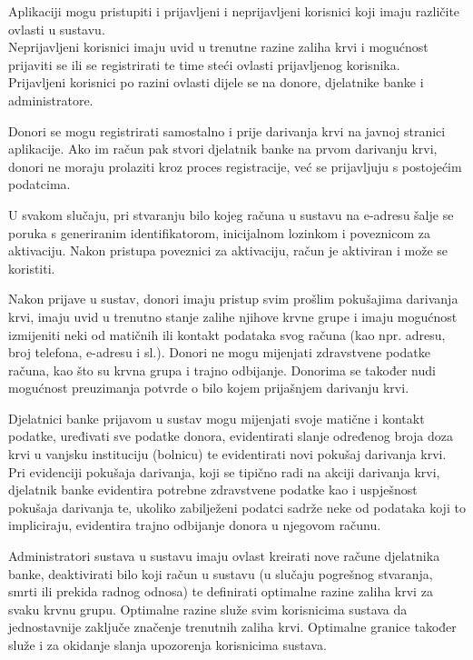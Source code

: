             \par{
            Aplikaciji mogu pristupiti i prijavljeni i neprijavljeni korisnici koji imaju različite ovlasti u sustavu.
            \\
            Neprijavljeni korisnici imaju uvid u trenutne razine zaliha krvi i mogućnost prijaviti se ili se registrirati te time steći ovlasti prijavljenog korisnika.
            \\
            Prijavljeni korisnici po razini ovlasti dijele se na donore, djelatnike banke i administratore.
            }
             \par{
            Donori se mogu registrirati samostalno i prije darivanja krvi na javnoj stranici aplikacije. Ako im račun pak stvori djelatnik banke na prvom darivanju krvi, donori ne moraju prolaziti kroz proces registracije, već se prijavljuju s postojećim podatcima. 
            }
             \par{
            U svakom slučaju, pri stvaranju bilo kojeg računa u sustavu na e-adresu šalje se poruka s generiranim identifikatorom, inicijalnom lozinkom i poveznicom za aktivaciju. Nakon pristupa poveznici za aktivaciju, račun je aktiviran i može se koristiti.
            }
             \par{
            Nakon prijave u sustav, donori imaju pristup svim prošlim pokušajima darivanja krvi, imaju uvid u trenutno stanje zalihe njihove krvne grupe i imaju mogućnost izmijeniti neki od matičnih ili kontakt podataka svog računa (kao npr. adresu, broj telefona, e-adresu i sl.). Donori ne mogu mijenjati zdravstvene podatke računa, kao što su krvna grupa i trajno odbijanje. Donorima se također nudi mogućnost preuzimanja potvrde o bilo kojem prijašnjem darivanju krvi.
            }
             \par{Djelatnici banke prijavom u sustav mogu mijenjati svoje matične i kontakt podatke, uređivati sve podatke donora, evidentirati slanje određenog broja doza krvi u vanjsku instituciju (bolnicu) te evidentirati novi pokušaj darivanja krvi. Pri evidenciji pokušaja darivanja, koji se tipično radi na akciji darivanja krvi, djelatnik banke evidentira potrebne zdravstvene podatke kao i uspješnost pokušaja darivanja te, ukoliko zabilježeni podatci sadrže neke od podataka koji to impliciraju, evidentira trajno odbijanje donora u njegovom računu.
            }
            \par{
            Administratori sustava u sustavu imaju ovlast kreirati nove račune djelatnika banke, deaktivirati bilo koji račun u sustavu (u slučaju pogrešnog stvaranja, smrti ili prekida radnog odnosa) te definirati optimalne razine zaliha krvi za svaku krvnu grupu. Optimalne razine služe svim korisnicima sustava da jednostavnije zaključe značenje trenutnih zaliha krvi. Optimalne granice također služe i za okidanje slanja upozorenja korisnicima sustava. 
            }
